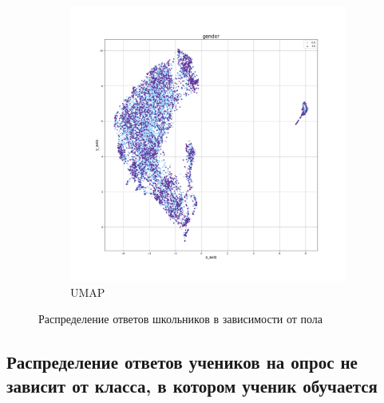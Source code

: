 \begin{figure}[h!]
\begin{subfigure}{.5\textwidth}
      \includegraphics[width=\linewidth]{../img/students_UMAP_gender.png}
      \caption{UMAP}
      \label{img::students::gender::UMAP}
    \end{subfigure}
    \caption{Распределение ответов школьников в зависимости от пола}
\end{figure}

\subsection{Распределение ответов учеников на опрос не зависит от класса, в котором ученик обучается}

